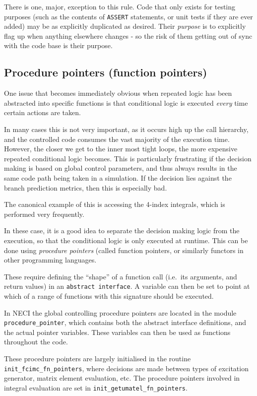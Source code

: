 \documentclass[a4paper,notitlepage]{scrreprt}
\let\code\lstinline
\begin{document}
	There is one, major, exception to this rule. Code that only exists for
	testing purposes (such as the contents of \code{ASSERT} statements,
	or unit tests if they are ever added) may be as explicitly duplicated as
	desired. Their \emph{purpose} is to explicitly flag up when anything
	elsewhere changes - so the risk of them getting out of sync with the code
	base is their purpose.
	
	\subsection{Procedure pointers (function pointers)}
		One issue that becomes immediately obvious when repeated logic has
		been abstracted into specific functions is that conditional logic is
		executed \emph{every} time certain actions are taken.
		
		In many cases this is not very important, as it occurs high up the
		call hierarchy, and the controlled code consumes the vast majority of
		the execution time. However, the closer we get to the inner most tight
		loops, the more expensive repeated conditional logic becomes. This
		is particularly frustrating if the decision making is based on global
		control parameters, and thus always results in the same code path being
		taken in a simulation. If the decision lies against the branch
		prediction metrics, then this is especially bad.
		
		The canonical example of this is accessing the 4-index integrals, which
		is performed very frequently.
		
		In these case, it is a good idea to separate the decision making logic
		from the execution, so that the conditional logic is only executed at
		runtime. This can be done using \emph{procedure pointers} (called
		function pointers, or similarly functors in other programming
		languages.
	
		These require defining the ``shape'' of a function call (i.e.\ its
		arguments, and return values) in an \code{abstract interface}. A
		variable can then be set to point at which of a range of functions
		with this signature should be executed.
		
		In NECI the global controlling procedure pointers are located in
		the module \code{procedure_pointer}, which contains both the abstract
		interface definitions, and the actual pointer variables. These
		variables can then be used as functions throughout the code.
		
		These procedure pointers are largely initialised in the routine
		\code{init_fcimc_fn_pointers}, where decisions are made between types
		of excitation generator, matrix element evaluation, etc. The procedure
		pointers involved in integral evaluation are set in
		\code{init_getumatel_fn_pointers}.
		
\end{document}
